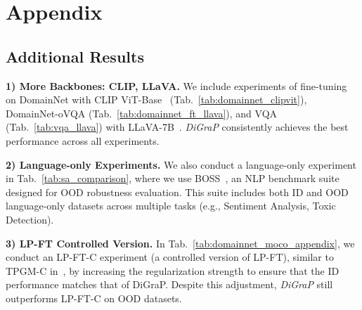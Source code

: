 \newpage
\section{Appendix}
% 
% 

% 

% 

\subsection{Additional Results}
\label{sec:more_results}

\noindent \textbf{1) More Backbones: CLIP, LLaVA.} We include experiments of fine-tuning on DomainNet with CLIP ViT-Base~\citep{radford_learning_2021} (Tab.~\ref{tab:domainnet_clipvit}), DomainNet-oVQA (Tab.~\ref{tab:domainnet_ft_llava}), and VQA (Tab.~\ref{tab:vqa_llava}) with LLaVA-7B~\citep{liu2023visualinstructiontuning}. \textit{DiGraP} consistently achieves the best performance across all experiments.





\noindent \textbf{2) Language-only Experiments.} We also conduct a language-only experiment in Tab.~\ref{tab:sa_comparison}, where we use BOSS~\citep{yuan2023revisitingoutofdistributionrobustnessnlp}, an NLP benchmark suite designed for OOD robustness evaluation. This suite includes both ID and OOD language-only datasets across multiple tasks (e.g., Sentiment Analysis, Toxic Detection). 



\noindent \textbf{3) LP-FT Controlled Version.} In Tab.~\ref{tab:domainnet_moco_appendix}, we conduct an LP-FT-C experiment (a controlled version of LP-FT), similar to TPGM-C in~\citet{tian_trainable_2023}, by increasing the regularization strength to ensure that the ID performance matches that of DiGraP. Despite this adjustment, \textit{DiGraP} still outperforms LP-FT-C on OOD datasets.

